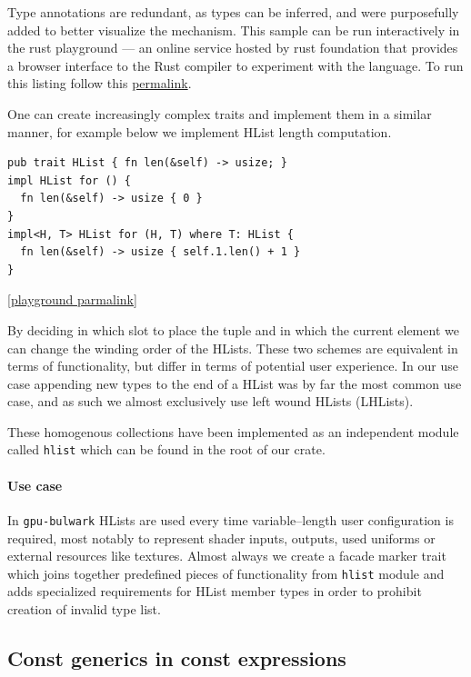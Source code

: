Type annotations are redundant, as types can be inferred, and were purposefully added to better visualize the mechanism.
This sample can be run interactively in the rust playground --- an online service hosted by rust foundation that provides 
a browser interface to the Rust compiler to experiment with the language. 
To run this listing follow this \href{https://play.rust-lang.org/?version=stable&mode=debug&edition=2021&gist=0c13e950bb10a01dbae1981b0c15aa5f}{permalink}.

One can create increasingly complex traits and implement them in a similar manner, for example below we implement HList length computation.

\begin{lstlisting}
pub trait HList { fn len(&self) -> usize; }
impl HList for () {
  fn len(&self) -> usize { 0 }
}
impl<H, T> HList for (H, T) where T: HList {
  fn len(&self) -> usize { self.1.len() + 1 }
}
\end{lstlisting}

\noindent \href{https://play.rust-lang.org/?version=stable&mode=debug&edition=2021&gist=13d2d29f768d207f8fe7fa1bde7acef1}{[playground parmalink]}

By deciding in which slot to place the tuple and in which the current element we can change the winding order of the HLists.
These two schemes are equivalent in terms of functionality, but differ in terms of potential user experience.
In our use case appending new types to the end of a HList was by far the most common use case, and as such we almost exclusively use left wound HLists (LHLists).

These homogenous collections have been implemented as an independent module called \texttt{hlist} which can be found in the root of our crate.

\paragraph{Use case}

In \texttt{gpu-bulwark} HLists are used every time variable--length user configuration is required, most notably to represent shader inputs, outputs, used uniforms or external resources like textures.
Almost always we create a facade marker trait which joins together predefined pieces of functionality from \texttt{hlist} module
and adds specialized requirements for HList member types in order to prohibit creation of invalid type list.

\subsection{Const generics in const expressions}

